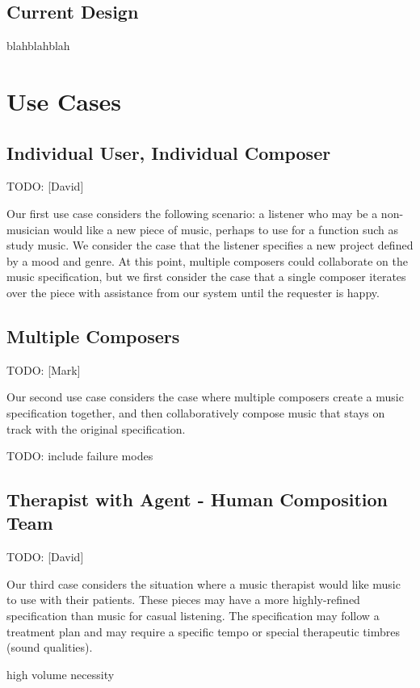 \documentclass[final,authoryear,11pt,times]{elsarticle}
\begin{document}
\subsection{Current Design}

blahblahblah

\section{Use Cases}

\subsection{Individual User, Individual Composer}

TODO: [David]

Our first use case considers the following scenario: a listener who may be a non-musician would like a new piece of music, perhaps to use for a function such as study music. We consider the case that the listener specifies a new project defined by a mood and genre. At this point, multiple composers could collaborate on the music specification, but we first consider the case that a single composer iterates over the piece with assistance from our system until the requester is happy.


\subsection{Multiple Composers}
TODO: [Mark]

Our second use case considers the case where multiple composers create a music specification together, and then collaboratively compose music that stays on track with the original specification.

TODO: include failure modes

\subsection{Therapist with Agent - Human Composition Team}

TODO: [David]

Our third case considers the situation where a music therapist would like music to use with their patients. These pieces may have a more highly-refined specification than music for casual listening. The specification may follow a treatment plan and may require a specific tempo or special therapeutic timbres (sound qualities).

high volume necessity
\end{document}
